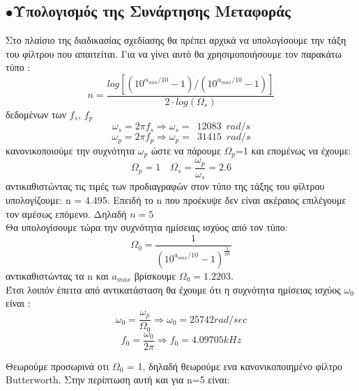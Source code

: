 \documentclass{article}
\begin{document}
{{ \subsection*{$\bullet$Υπολογισμός της Συνάρτησης Μεταφοράς}
 

Στο πλαίσιο της διαδικασίας σχεδίασης θα πρέπει αρχικά να υπολογίσουμε την τάξη του φίλτρου που απαιτείται. Για να γίνει αυτό θα χρησιμοποιήσουμε τον παρακάτω τύπο :
\begin{equation}
\boxed{n=\frac{log[(10^{{α_{min}}/{10}}-1)/ (10^{{α_{max}}/{10}}-1)]}{2 \cdot log(Ω_s)}
}
\end{equation}
δεδομένων των $f_s$, $f_p$
\begin{equation*}
ω_s = 2πf_s \Rightarrow \boxed{ω_s =\enspace 12083 \enspace rad/s}
\end{equation*}
\begin{equation*}
ω_p = 2πf_p \Rightarrow \boxed{ω_p =\enspace 31415 \enspace rad/s}   
\end{equation*}
κανονικοποιούμε την συχνότητα $ω_p$ ώστε να πάρουμε $Ω_p$=1 και επομένως να έχουμε:
\begin{equation*}
\boxed{Ω_p = 1} \enspace \enspace \boxed{Ω_s = \frac{ω_p}{ω_s} = 2.6}
\end{equation*}
αντικαθιστώντας τις τιμές των προδιαγραφών στον τύπο της τάξης του φίλτρου υπολογίζουμε: n = 4.495. Επειδή το n που προέκυψε δεν είναι ακέραιος επιλέγουμε τον αμέσως επόμενο. Δηλαδή $\boxed{n=5}$ \\[0.4\baselineskip]
Θα υπολογίσουμε τώρα την συχνότητα ημίσειας ισχύος από τον τύπο:
\begin{equation*}
\boxed{
Ω_{0} = \frac{1}{(10^{a_{max}/10} -1)^{\frac{1}{2n}} }
}
\end{equation*} 
αντικαθιστώντας τα n και $a_{max}$ βρίσκουμε $\boxed{Ω_{0}=1.2203}$. \\
Έτσι λοιπόν έπειτα από αντικατάσταση θα έχουμε ότι η συχνότητα ημίσειας ισχύος $ω_{0}$ είναι :
\begin{equation*}
ω_{0} = \frac{ω_p}{Ω_0} \Rightarrow
\boxed{ω_{0} = 25742 rad/sec}
\end{equation*}
\begin{equation*}
f_{0} = \frac{ω_{0}}{2π} \Rightarrow \boxed{f_{0} = 4.09705 kHz} 
\end{equation*}

Θεωρούμε προσωρινά οτι $Ω_0$ = 1, δηλαδή θεωρούμε ενα κανονικοποιημένο φίλτρο Butterworth. Στην περίπτωση αυτή και για n=5 είναι:


}}
\end{document}
